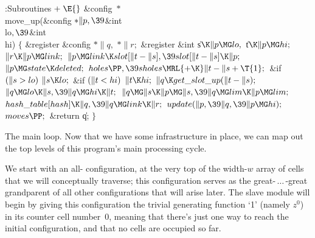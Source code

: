 \B{}:Subroutines\X${}\mathrel+\E{}$\6
\&{config} ${}{*}{}$\\{move\_up}(\&{config} ${}{*}\|p,\39{}$\&{int} \\{lo}${},%
\39{}$\&{int} \\{hi})\1\1\2\2\6
${}\{{}$\1\6
\&{register} \&{config} ${}{*}\|q,{}$ ${}{*}\|r;{}$\6
\&{register} \&{int} \|s${}\K\|p\MG\\{lo},{}$ \|t${}\K\|p\MG\\{hi};{}$\7
${}\|r\K\|p\MG\\{link};{}$\6
${}\|p\MG\\{link}\K\\{slot}[\|t-\|s],\39\\{slot}[\|t-\|s]\K\|p;{}$\6
${}\|p\MG\\{state}\K\\{deleted};{}$\6
${}\\{holes}\PP,\39\\{sholes}\MRL{+{\K}}\|t-\|s+\T{1};{}$\6
\&{if} ${}(\|s>\\{lo}){}$\1\5
${}\|s\K\\{lo};{}$\2\6
\&{if} ${}(\|t<\\{hi}){}$\1\5
${}\|t\K\\{hi};{}$\2\6
${}\|q\K\\{get\_slot\_up}(\|t-\|s);{}$\6
${}\|q\MG\\{lo}\K\|s,\39\|q\MG\\{hi}\K\|t;{}$\6
${}\|q\MG\|s\K\|p\MG\|s,\39\|q\MG\\{lim}\K\|p\MG\\{lim};{}$\6
${}\\{hash\_table}[\\{hash}]\K\|q,\39\|q\MG\\{link}\K\|r;{}$\6
${}\\{update}(\|p,\39\|q,\39\|p\MG\\{hi});{}$\6
${}\\{moves}\PP;{}$\6
\&{return} \|q;\6
\4${}\}{}$\2\par
\fi

The main loop. Now that we have some infrastructure in
place,
we can map out the top levels of this program's main processing cycle.

We start with an all- configuration, at the very top of the
width-$w$ array of cells that we will conceptually traverse; this configuration
serves as the great-$\,\ldots\,$-great grandparent of all other
configurations that will arise later. The slave module will begin
by giving this configuration the trivial generating function `1' (namely
$z^0$) in its counter cell number~0, meaning that there's just one way to
reach the initial configuration, and that no cells are occupied so far.

